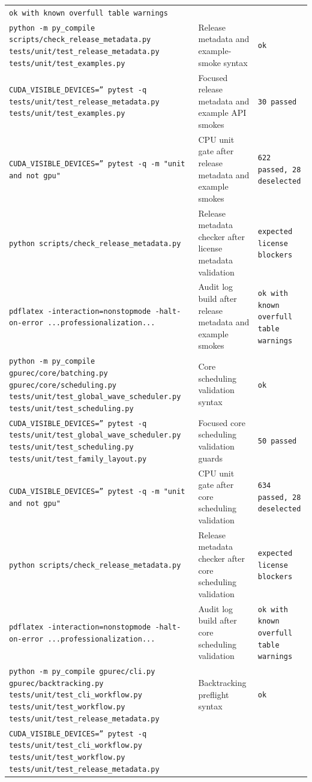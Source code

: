 \documentclass[11pt]{article}
\begin{document}
\begin{center}
\begin{tabular}{lll}
\texttt{ok with known overfull table warnings} \\
\texttt{python -m py\_compile scripts/check\_release\_metadata.py tests/unit/test\_release\_metadata.py tests/unit/test\_examples.py} &
Release metadata and example-smoke syntax &
\texttt{ok} \\
\texttt{CUDA\_VISIBLE\_DEVICES='' pytest -q tests/unit/test\_release\_metadata.py tests/unit/test\_examples.py} &
Focused release metadata and example API smokes &
\texttt{30 passed} \\
\texttt{CUDA\_VISIBLE\_DEVICES='' pytest -q -m "unit and not gpu"} &
CPU unit gate after release metadata and example smokes &
\texttt{622 passed, 28 deselected} \\
\texttt{python scripts/check\_release\_metadata.py} &
Release metadata checker after license metadata validation &
\texttt{expected license blockers} \\
\texttt{pdflatex -interaction=nonstopmode -halt-on-error ...professionalization...} &
Audit log build after release metadata and example smokes &
\texttt{ok with known overfull table warnings} \\
\texttt{python -m py\_compile gpurec/core/batching.py gpurec/core/scheduling.py tests/unit/test\_global\_wave\_scheduler.py tests/unit/test\_scheduling.py} &
Core scheduling validation syntax &
\texttt{ok} \\
\texttt{CUDA\_VISIBLE\_DEVICES='' pytest -q tests/unit/test\_global\_wave\_scheduler.py tests/unit/test\_scheduling.py tests/unit/test\_family\_layout.py} &
Focused core scheduling validation guards &
\texttt{50 passed} \\
\texttt{CUDA\_VISIBLE\_DEVICES='' pytest -q -m "unit and not gpu"} &
CPU unit gate after core scheduling validation &
\texttt{634 passed, 28 deselected} \\
\texttt{python scripts/check\_release\_metadata.py} &
Release metadata checker after core scheduling validation &
\texttt{expected license blockers} \\
\texttt{pdflatex -interaction=nonstopmode -halt-on-error ...professionalization...} &
Audit log build after core scheduling validation &
\texttt{ok with known overfull table warnings} \\
\texttt{python -m py\_compile gpurec/cli.py gpurec/backtracking.py tests/unit/test\_cli\_workflow.py tests/unit/test\_workflow.py tests/unit/test\_release\_metadata.py} &
Backtracking preflight syntax &
\texttt{ok} \\
\texttt{CUDA\_VISIBLE\_DEVICES='' pytest -q tests/unit/test\_cli\_workflow.py tests/unit/test\_workflow.py tests/unit/test\_release\_metadata.py} &

\end{tabular}
\end{center}
\end{document}
